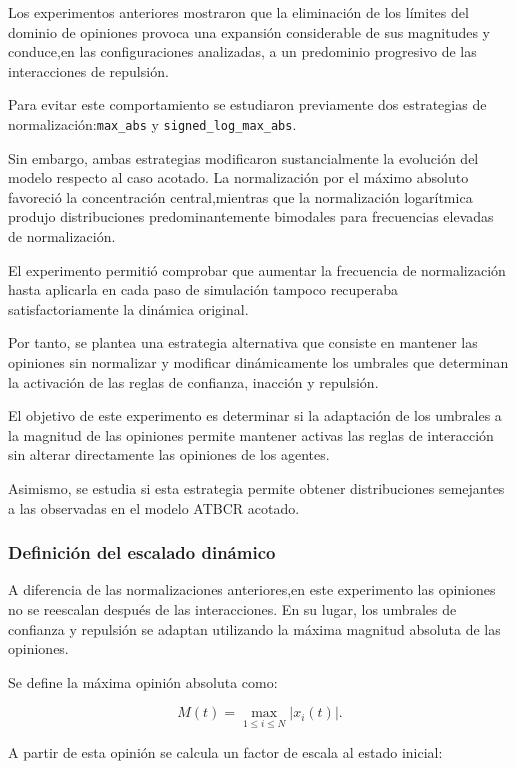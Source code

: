 \documentclass[11pt,a4paper]{article}
\begin{document}
Los experimentos anteriores mostraron que la eliminación de los límites del dominio de opiniones provoca una expansión considerable de sus magnitudes y conduce,en las configuraciones analizadas, a un predominio progresivo de las interacciones de repulsión.

Para evitar este comportamiento se estudiaron previamente dos estrategias de normalización:\texttt{max\_abs} y \texttt{signed\_log\_max\_abs}.

Sin embargo, ambas estrategias modificaron sustancialmente la evolución del modelo respecto al caso acotado. La normalización por el máximo absoluto favoreció la concentración central,mientras que la normalización logarítmica produjo distribuciones predominantemente bimodales para frecuencias elevadas de normalización.

El experimento permitió comprobar que aumentar la frecuencia de normalización hasta aplicarla en cada paso de simulación tampoco recuperaba satisfactoriamente la dinámica original.

Por tanto, se plantea una estrategia alternativa que consiste en mantener las opiniones sin normalizar y modificar dinámicamente los umbrales que determinan la activación de las reglas de confianza, inacción y repulsión.

El objetivo de este experimento es determinar si la adaptación de los umbrales a la magnitud de las opiniones permite mantener activas las reglas de interacción sin alterar directamente las opiniones de los agentes.

Asimismo, se estudia si esta estrategia permite obtener distribuciones semejantes a las observadas en el modelo ATBCR acotado.

\subsubsection{Definición del escalado dinámico}

A diferencia de las normalizaciones anteriores,en este experimento las opiniones no se reescalan después de las interacciones.
En su lugar, los umbrales de confianza y repulsión se adaptan utilizando la máxima magnitud absoluta de las opiniones.

Se define la máxima opinión absoluta como:

\begin{equation}
    M(t)=\max_{1\leq i\leq N}|x_i(t)|.
\end{equation}

A partir de esta opinión se calcula un factor de escala al estado inicial:
\end{document}
